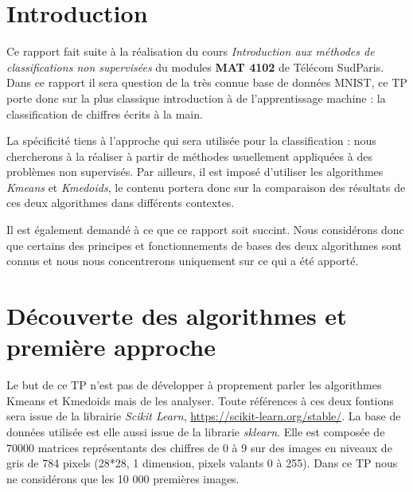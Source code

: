 \documentclass{article}
\begin{document}
\newpage


\section{Introduction}
Ce rapport fait suite à la réalisation du cours \textit{Introduction aux méthodes de classifications non supervisées} du modules \textbf{MAT 4102} de Télécom SudParis. \newline
Dans ce rapport il sera question de la très connue base de données MNIST, ce TP porte donc sur la plus classique introduction à de l'apprentissage machine : la classification de chiffres écrits à la main.  

La spécificité tiens à l'approche qui sera utilisée pour la classification : nous chercherons à la réaliser à partir de méthodes usuellement appliquées à des problèmes non supervisés. 
Par ailleurs, il est imposé d'utiliser les algorithmes \textit{Kmeans} et \textit{Kmedoids}, le contenu portera donc sur la comparaison des résultats de ces deux algorithmes dans différents contextes.

\vspace{2mm}
Il est également demandé à ce que ce rapport soit succint. Nous considérons donc que certains des principes et fonctionnements de bases des deux algorithmes sont connus et nous nous concentrerons uniquement sur ce qui a été apporté.


\newpage

\section{Découverte des algorithmes et première approche}
\vspace{4mm}

Le but de ce TP n'est pas de développer à proprement parler les algorithmes Kmeans et Kmedoids mais de les analyser. Toute références à ces deux fontions sera issue de la librairie \textit{Scikit Learn},  \url{https://scikit-learn.org/stable/}. La base de données utilisée est elle aussi issue de la librarie \textit{sklearn}. Elle est composée de $70000$ matrices représentants des chiffres de 0 à 9 sur des images en niveaux de gris de 784 pixels (28*28, 1 dimension, pixels valants 0 à 255). Dans ce TP nous ne considérons que les 10 000 premières images.
\end{document}
